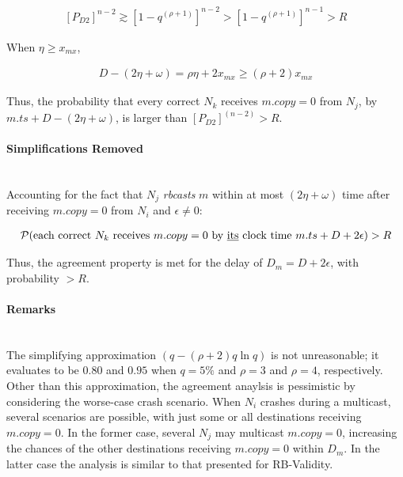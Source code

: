     \begin{equation}
        \begin{aligned}
                \left[P_{D2} \right]^{n-2} \gtrsim \left[ 1 - q^{(\rho+1)} \right] ^{n-2} > \left[ 1 - q ^{(\rho + 1)}\right]^{n-1} > R
        \end{aligned}
    \end{equation}
    
    
    When $\eta \geq x_{mx}$,
    
    \begin{equation}
        \begin{aligned}
                D - \left( 2 \eta + \omega \right) = \rho \eta + 2 x_{mx} \geq (\rho + 2) x_{mx}
            \end{aligned}
        \end{equation}
        
    Thus, the probability that every correct $N_k$ receives $m.copy = 0$ from $N_j$, by ${m.ts + D - (2\eta + \omega)}$, is larger than ${\left[P_{D2}\right]^{(n - 2)} > R}$.  

    \paragraph{Simplifications Removed} \hfill \\    
    Accounting for the fact that $N_j$ \emph{rbcasts} $m$ within at most $(2 \eta + \omega)$ time after receiving $m.copy = 0$ from $N_i$ and $\epsilon \neq 0$:
    
    \begin{equation}
        \begin{aligned}
                \mathcal{P}(\text{each correct } N_k \text{ receives } m.copy = 0 \text{ by \underline{its} clock time } m.ts + D + 2\epsilon) > R
         \end{aligned}
    \end{equation}
    
    Thus, the agreement property is met for the delay of $D_m = D + 2\epsilon$, with probability $> R$.  
    
    \paragraph{Remarks} \hfill \\
    The simplifying approximation $(q - (\rho + 2) q \ln q)$ is not unreasonable; it evaluates to be $0.80$ and $0.95$ when $q = 5\%$ and $\rho = 3$ and $\rho = 4$, respectively.  Other than this approximation, the agreement anaylsis is pessimistic by considering the worse-case crash scenario.  When $N_i$ crashes during a multicast, several scenarios are possible, with just some or all destinations receiving $m.copy = 0$.  In the former case, several $N_j$ may multicast $m.copy = 0$, increasing the chances of the other destinations receiving $m.copy = 0$ within $D_m$.  In the latter case the analysis is similar to that presented for RB-Validity.  
    
